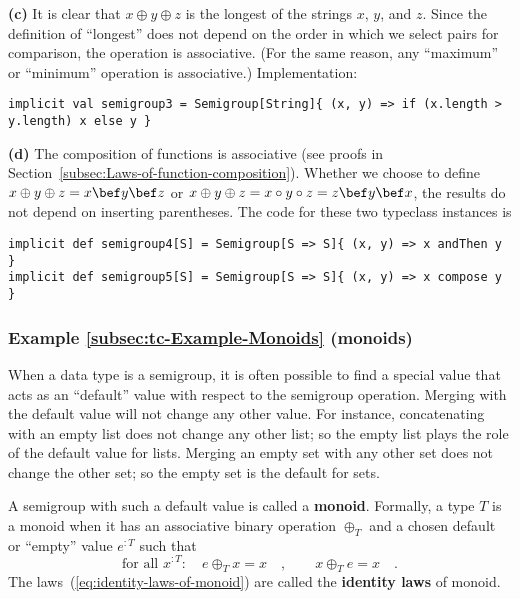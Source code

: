 \textbf{(c)} It is clear that $x\oplus y\oplus z$ is the longest
of the strings $x$, $y$, and $z$. Since the definition of ``longest''
does not depend on the order in which we select pairs for comparison,
the operation is associative. (For the same reason, any ``maximum''
or ``minimum'' operation is associative.) Implementation:
\begin{lstlisting}
implicit val semigroup3 = Semigroup[String]{ (x, y) => if (x.length > y.length) x else y }
\end{lstlisting}

\textbf{(d)} The composition of functions is associative (see proofs
in Section~\ref{subsec:Laws-of-function-composition}). Whether we
choose to define $x\oplus y\oplus z=x\bef y\bef z$ or $x\oplus y\oplus z=x\circ y\circ z=z\bef y\bef x$,
the results do not depend on inserting parentheses. The code for these
two typeclass instances is
\begin{lstlisting}
implicit def semigroup4[S] = Semigroup[S => S]{ (x, y) => x andThen y }
implicit def semigroup5[S] = Semigroup[S => S]{ (x, y) => x compose y }
\end{lstlisting}


\subsubsection{Example \label{subsec:tc-Example-Monoids}\ref{subsec:tc-Example-Monoids}
(monoids)}

When a data type is a semigroup, it is often possible to find a special
value that acts as an ``default'' value with respect to the semigroup
operation. Merging with the default value will not change any other
value. For instance, concatenating with an empty list does not change
any other list; so the empty list plays the role of the default value
for lists. Merging an empty set with any other set does not change
the other set; so the empty set is the default for sets.

A semigroup with such a default value is called a \textbf{monoid}.
Formally, a type $T$ is a monoid when it has an associative binary
operation $\oplus_{T}$ and a chosen default or ``empty'' value
$e^{:T}$ such that 
\begin{equation}
\text{for all }x^{:T}:\quad e\oplus_{T}x=x\quad,\quad\quad x\oplus_{T}e=x\quad.\label{eq:identity-laws-of-monoid}
\end{equation}
The laws~(\ref{eq:identity-laws-of-monoid}) are called the \textbf{identity
laws} of monoid. 

